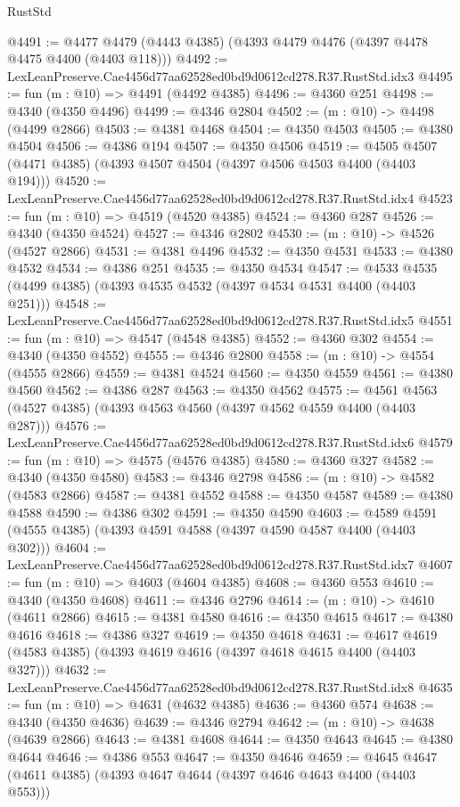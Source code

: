 \begin{lexlean}{RustStd}
\begin{coremodule}
@4491 := @4477 @4479 (@4443 @4385) (@4393 @4479 @4476 (@4397 @4478 @4475 @4400 (@4403 @118)))
@4492 := LexLeanPreserve.Cae4456d77aa62528ed0bd9d0612cd278.R37.RustStd.idx3
@4495 := fun (m : @10) => @4491 (@4492 @4385)
@4496 := @4360 @251
@4498 := @4340 (@4350 @4496)
@4499 := @4346 @2804
@4502 := (m : @10) -> @4498 (@4499 @2866)
@4503 := @4381 @4468
@4504 := @4350 @4503
@4505 := @4380 @4504
@4506 := @4386 @194
@4507 := @4350 @4506
@4519 := @4505 @4507 (@4471 @4385) (@4393 @4507 @4504 (@4397 @4506 @4503 @4400 (@4403 @194)))
@4520 := LexLeanPreserve.Cae4456d77aa62528ed0bd9d0612cd278.R37.RustStd.idx4
@4523 := fun (m : @10) => @4519 (@4520 @4385)
@4524 := @4360 @287
@4526 := @4340 (@4350 @4524)
@4527 := @4346 @2802
@4530 := (m : @10) -> @4526 (@4527 @2866)
@4531 := @4381 @4496
@4532 := @4350 @4531
@4533 := @4380 @4532
@4534 := @4386 @251
@4535 := @4350 @4534
@4547 := @4533 @4535 (@4499 @4385) (@4393 @4535 @4532 (@4397 @4534 @4531 @4400 (@4403 @251)))
@4548 := LexLeanPreserve.Cae4456d77aa62528ed0bd9d0612cd278.R37.RustStd.idx5
@4551 := fun (m : @10) => @4547 (@4548 @4385)
@4552 := @4360 @302
@4554 := @4340 (@4350 @4552)
@4555 := @4346 @2800
@4558 := (m : @10) -> @4554 (@4555 @2866)
@4559 := @4381 @4524
@4560 := @4350 @4559
@4561 := @4380 @4560
@4562 := @4386 @287
@4563 := @4350 @4562
@4575 := @4561 @4563 (@4527 @4385) (@4393 @4563 @4560 (@4397 @4562 @4559 @4400 (@4403 @287)))
@4576 := LexLeanPreserve.Cae4456d77aa62528ed0bd9d0612cd278.R37.RustStd.idx6
@4579 := fun (m : @10) => @4575 (@4576 @4385)
@4580 := @4360 @327
@4582 := @4340 (@4350 @4580)
@4583 := @4346 @2798
@4586 := (m : @10) -> @4582 (@4583 @2866)
@4587 := @4381 @4552
@4588 := @4350 @4587
@4589 := @4380 @4588
@4590 := @4386 @302
@4591 := @4350 @4590
@4603 := @4589 @4591 (@4555 @4385) (@4393 @4591 @4588 (@4397 @4590 @4587 @4400 (@4403 @302)))
@4604 := LexLeanPreserve.Cae4456d77aa62528ed0bd9d0612cd278.R37.RustStd.idx7
@4607 := fun (m : @10) => @4603 (@4604 @4385)
@4608 := @4360 @553
@4610 := @4340 (@4350 @4608)
@4611 := @4346 @2796
@4614 := (m : @10) -> @4610 (@4611 @2866)
@4615 := @4381 @4580
@4616 := @4350 @4615
@4617 := @4380 @4616
@4618 := @4386 @327
@4619 := @4350 @4618
@4631 := @4617 @4619 (@4583 @4385) (@4393 @4619 @4616 (@4397 @4618 @4615 @4400 (@4403 @327)))
@4632 := LexLeanPreserve.Cae4456d77aa62528ed0bd9d0612cd278.R37.RustStd.idx8
@4635 := fun (m : @10) => @4631 (@4632 @4385)
@4636 := @4360 @574
@4638 := @4340 (@4350 @4636)
@4639 := @4346 @2794
@4642 := (m : @10) -> @4638 (@4639 @2866)
@4643 := @4381 @4608
@4644 := @4350 @4643
@4645 := @4380 @4644
@4646 := @4386 @553
@4647 := @4350 @4646
@4659 := @4645 @4647 (@4611 @4385) (@4393 @4647 @4644 (@4397 @4646 @4643 @4400 (@4403 @553)))

\end{coremodule}
\end{lexlean}
